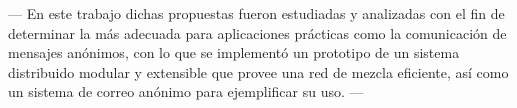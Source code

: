 ---
En este trabajo dichas propuestas fueron estudiadas y analizadas con el fin de determinar la más adecuada para aplicaciones prácticas como la comunicación de mensajes anónimos, con lo que se implementó un prototipo de un sistema distribuido modular y extensible que provee una red de mezcla eficiente, así como un sistema de correo anónimo para ejemplificar su uso.
---










































































































